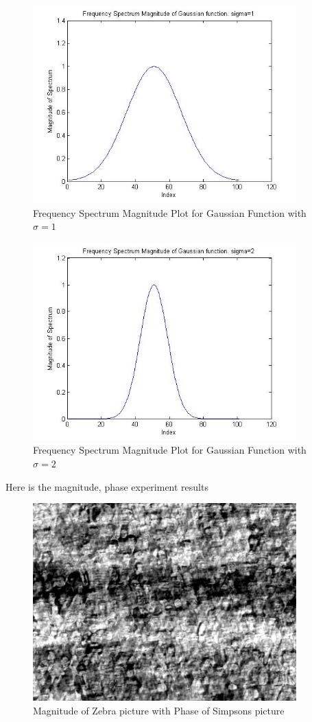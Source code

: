 \documentclass[11pt,psfig]{article}
\begin{document}
\begin{figure}[H]
\centering
\includegraphics[height=3in]{prob6plot_freqGauss1.jpg}
\caption{Frequency Spectrum Magnitude Plot for Gaussian Function with $\sigma=1$}
\end{figure}

\begin{figure}[H]
\centering
\includegraphics[height=3in]{prob6plot_freqGauss2.jpg}
\caption{Frequency Spectrum Magnitude Plot for Gaussian Function with $\sigma=2$}
\end{figure}

Here is the magnitude, phase experiment results

\begin{figure}[H]
\centering
\includegraphics[height=3in]{mag_zebra_phase_simpsons.jpg}
\caption{Magnitude of Zebra picture with Phase of Simpsons picture}
\end{figure}
\end{document}
